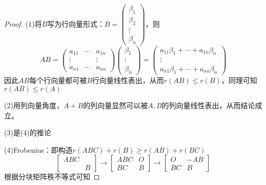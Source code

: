 \begin{proof}
  (1)将$B$写为行向量形式：$B = \left(
    \begin{array}{c}
      \beta_1\\
      \beta_2\\
      \vdots\\
      \beta_n
    \end{array}
  \right)$，则
  \begin{equation*}
    AB = \left(
      \begin{array}{ccc}
        a_{11}&\cdots&a_{1n}\\
        \vdots&&\vdots\\
        a_{n1}&\cdots&a_{nn}
      \end{array}
    \right) \left(
      \begin{array}{c}
        \beta_1\\
        \vdots\\
        \beta_n
      \end{array}
    \right) = \left(
      \begin{array}{c}
        a_{11}\beta_1 + \cdots + a_{1n}\beta_n\\
        \vdots\\
        a_{n1}\beta_1 + \cdots + a_{nn}\beta_n
      \end{array}
    \right)
  \end{equation*}
  因此$AB$每个行向量都可被$B$行向量线性表出，从而$r(AB) \leq r(B)$，同理可知$r(AB) \leq r(A)$

  (2)用列向量角度，$A+B$的列向量显然可以被$A,B$的列向量线性表出，从而结论成立。
  
  
  (3)是(4)的推论
  
  (4)Frobenius：即构造$r(ABC) + r(B) \geq r(AB) + r(BC)$
  \begin{equation*}
    \left[
      \begin{array}{cc}
        ABC& \\
           &B
      \end{array}
    \right] \rightarrow \left[
      \begin{array}{cc}
        ABC&O \\
           BC&B
      \end{array}
    \right] \rightarrow \left[
      \begin{array}{cc}
       O &-AB \\
         BC&B
      \end{array}
    \right]
  \end{equation*}
  根据分块矩阵秩不等式可知
\end{proof}

